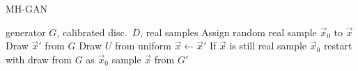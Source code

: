 \begin{algorithm}[tb]
   \caption{MH-GAN}
   \label{alg:mhgan}
\begin{algorithmic}
    generator $G$, calibrated disc.~$D$, real samples
   \STATE Assign random real sample $\vec x_0$ to $\vec x$
   \STATE Draw $\vec x'$ from $G$
   \STATE Draw $U$ from uniform
   \STATE $\vec x \leftarrow \vec x'$
   \ENDIF
   \ENDFOR
   \STATE If $\vec x$ is still real sample $\vec x_0$ restart with draw from $G$ as $\vec x_0$
    sample $\vec x$ from $G'$
\end{algorithmic}
\end{algorithm}

